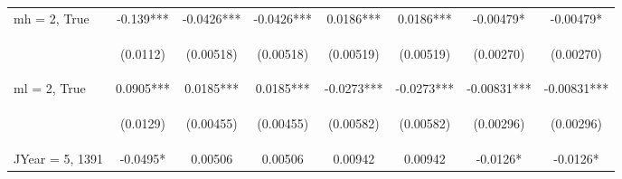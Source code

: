 \documentclass[]{article}
\begin{document}
\begin{center}
\begin{tabular}{lccccccc}
mh = 2, True & -0.139*** & -0.0426*** & -0.0426*** & 0.0186*** & 0.0186*** & -0.00479* & -0.00479* \\
\vspace{4pt} & \begin{footnotesize}(0.0112)\end{footnotesize} & \begin{footnotesize}(0.00518)\end{footnotesize} & \begin{footnotesize}(0.00518)\end{footnotesize} & \begin{footnotesize}(0.00519)\end{footnotesize} & \begin{footnotesize}(0.00519)\end{footnotesize} & \begin{footnotesize}(0.00270)\end{footnotesize} & \begin{footnotesize}(0.00270)\end{footnotesize} \\
ml = 2, True & 0.0905*** & 0.0185*** & 0.0185*** & -0.0273*** & -0.0273*** & -0.00831*** & -0.00831*** \\
\vspace{4pt} & \begin{footnotesize}(0.0129)\end{footnotesize} & \begin{footnotesize}(0.00455)\end{footnotesize} & \begin{footnotesize}(0.00455)\end{footnotesize} & \begin{footnotesize}(0.00582)\end{footnotesize} & \begin{footnotesize}(0.00582)\end{footnotesize} & \begin{footnotesize}(0.00296)\end{footnotesize} & \begin{footnotesize}(0.00296)\end{footnotesize} \\
JYear = 5, 1391 & -0.0495* & 0.00506 & 0.00506 & 0.00942 & 0.00942 & -0.0126* & -0.0126* \\

\end{tabular}
\end{center}
\end{document}

